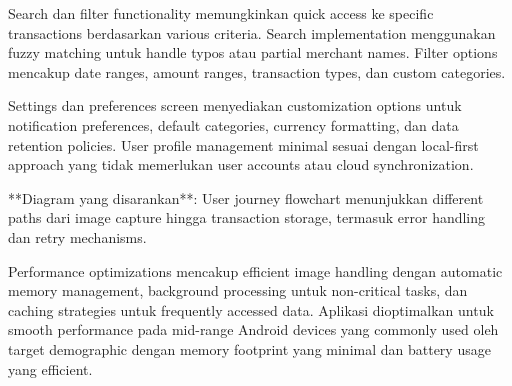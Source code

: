 Search dan filter functionality memungkinkan quick access ke specific transactions berdasarkan various criteria. Search implementation menggunakan fuzzy matching untuk handle typos atau partial merchant names. Filter options mencakup date ranges, amount ranges, transaction types, dan custom categories.

Settings dan preferences screen menyediakan customization options untuk notification preferences, default categories, currency formatting, dan data retention policies. User profile management minimal sesuai dengan local-first approach yang tidak memerlukan user accounts atau cloud synchronization.

**Diagram yang disarankan**: User journey flowchart menunjukkan different paths dari image capture hingga transaction storage, termasuk error handling dan retry mechanisms.

Performance optimizations mencakup efficient image handling dengan automatic memory management, background processing untuk non-critical tasks, dan caching strategies untuk frequently accessed data. Aplikasi dioptimalkan untuk smooth performance pada mid-range Android devices yang commonly used oleh target demographic dengan memory footprint yang minimal dan battery usage yang efficient.
